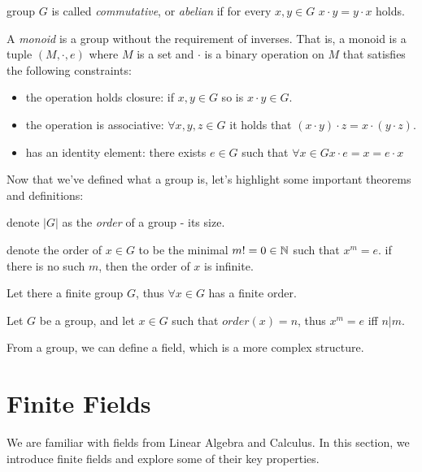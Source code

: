 \begin{definition}
    group $G$ is called \emph{commutative}, or \emph{abelian} if for every $x,y\in G$ $x\cdot y=y\cdot x$ holds.
\end{definition}


\begin{definition}[monoid] \label{def:monoid}
    A \emph{monoid} is a group without the requirement of inverses.
    That is, a monoid is a tuple $(M,\cdot,e)$ where $M$ is a set and $\cdot$ is a binary operation on $M$
    that satisfies the following constraints:

    \begin{itemize}
    \item the operation holds closure: if $x,y\in G$ so is $x\cdot y\in G$.
    \item the operation is associative: $\forall x,y,z\in G$ it holds that $(x\cdot y)\cdot z = x\cdot (y\cdot z)$.
    \item has an identity element: there exists $e\in G$ such that $\forall x\in G x\cdot e = x = e\cdot x$
    \end{itemize}
\end{definition}


Now that we've defined what a group is, let's highlight some important theorems and definitions:

\begin{definition}
    denote $|G|$ as the \emph{order} of a group - its size.
\end{definition}

\begin{definition}
    denote the order of $x\in G$ to be the minimal $m!=0\in\mathbb{N}$ such that  $x^m=e$. if there is no such $m$, then
    the order of $x$ is infinite.
\end{definition}

\begin{theorem}
    Let there a finite group $G$, thus $\forall x\in G$ has a finite order.
\end{theorem}

\begin{theorem}
    Let $G$ be a group, and let $x\in G$ such that $order(x)=n$, thus $x^m=e$ iff $n|m$.
\end{theorem}

From a group, we can define a field, which is a more complex structure.

\section{Finite Fields}
We are familiar with fields from Linear Algebra and Calculus.
In this section, we introduce finite fields and explore some of their key properties.

